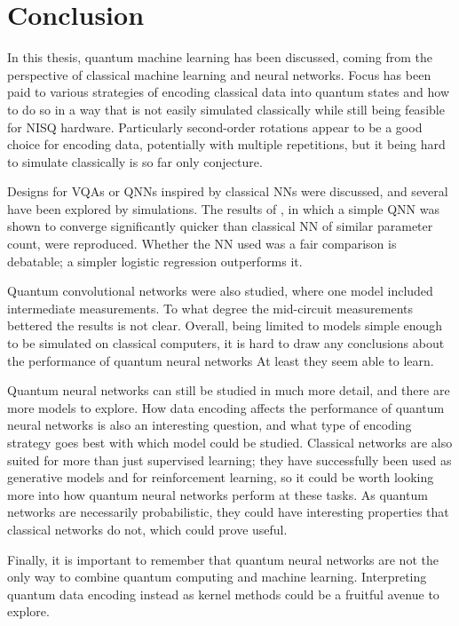 \chapter{Conclusion}
\label{chap:conclusion}
In this thesis, quantum machine learning has been discussed, coming from the perspective of classical machine learning and neural networks.
Focus has been paid to various strategies of encoding classical data into quantum states and how to do so in a way that is not easily simulated classically while still being feasible for NISQ hardware.
Particularly second-order rotations appear to be a good choice for encoding data, potentially with multiple repetitions, but it being hard to simulate classically is so far only conjecture.

Designs for VQAs or QNNs inspired by classical NNs were discussed, and several have been explored by simulations.
The results of \cite{abbas2021}, in which a simple QNN was shown to converge significantly quicker than classical NN of similar parameter count, were reproduced.
Whether the NN used was a fair comparison is debatable; a simpler logistic regression outperforms it.

Quantum convolutional networks were also studied, where one model included intermediate measurements.
To what degree the mid-circuit measurements bettered the results is not clear.
Overall, being limited to models simple enough to be simulated on classical computers, it is hard to draw any conclusions about the performance of quantum neural networks
At least they seem able to learn.

Quantum neural networks can still be studied in much more detail, and there are more models to explore.
How data encoding affects the performance of quantum neural networks is also an interesting question, and what type of encoding strategy goes best with which model could be studied.
Classical networks are also suited for more than just supervised learning; they have successfully been used as generative models and for reinforcement learning, so it could be worth looking more into how quantum neural networks perform at these tasks.
As quantum networks are necessarily probabilistic, they could have interesting properties that classical networks do not, which could prove useful.

Finally, it is important to remember that quantum neural networks are not the only way to combine quantum computing and machine learning.
Interpreting quantum data encoding instead as kernel methods could be a fruitful avenue to explore.